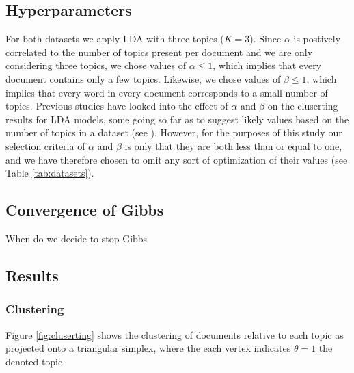 \documentclass[10pt]{article}
\begin{document}
%
%
\subsection{Hyperparameters}
For both datasets we apply LDA with three topics ($K = 3$). Since $\alpha$ is postively correlated to the number of topics present per document and we are only considering three topics, we chose values of $\alpha \leq 1$, which implies that every document contains only a few topics. Likewise, we chose values of $\beta \leq 1$, which implies that every word in every document corresponds to a small number of topics. Previous studies have looked into the effect of $\alpha$ and $\beta$ on the cluserting results for LDA models, some going so far as to suggest likely values based on the number of topics in a dataset (see \cite{Griffiths2004}). However, for the purposes of this study our selection criteria of $\alpha$ and $\beta$ is only that they are both less than or equal to one, and we have therefore chosen to omit any sort of optimization of their values (see Table \ref{tab:datasets}).


%
%
\subsection{Convergence of Gibbs}
When do we decide to stop Gibbs


%
%
\subsection{Results}

\subsubsection{Clustering}
Figure \ref{fig:cluserting} shows the clustering of documents relative to each topic as projected onto a triangular simplex, where the each vertex indicates $\theta = 1$ the denoted topic.
\end{document}
